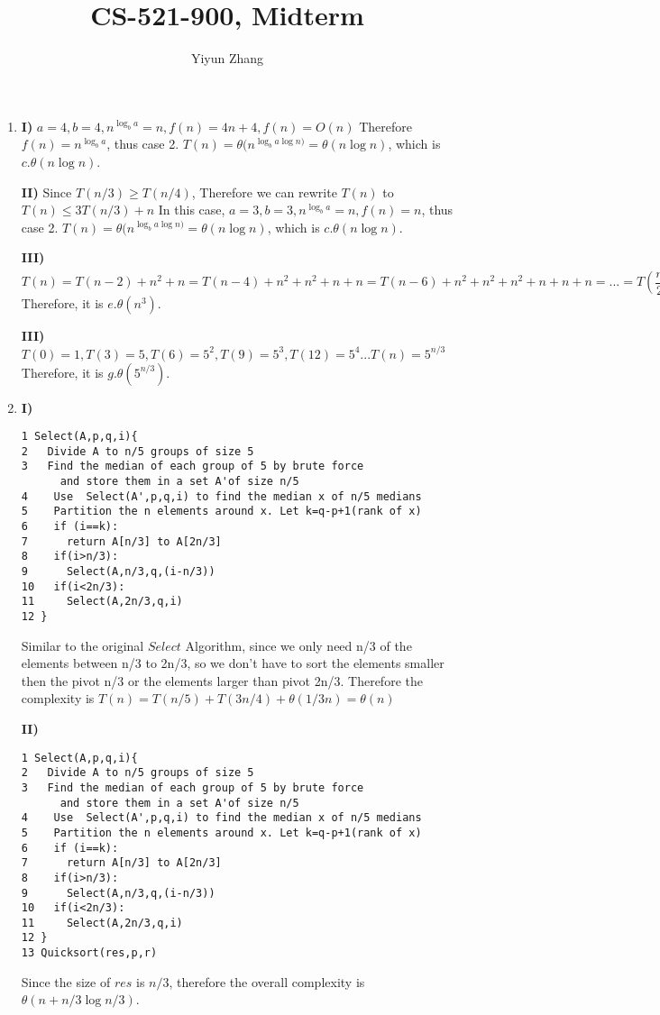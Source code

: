 \documentclass{article}
\title{CS-521-900, Midterm}
\author{Yiyun Zhang}
\begin{document}
\maketitle

\begin{enumerate}
\item 
{\bf I)} $a=4, b=4, n^{\log_b a}=n, f(n)=4n+4, f(n)=O(n)$ Therefore $f(n)=n^{\log_b a}$, thus case 2. $T(n)=\theta (n^{\log_b a\log n)}=\theta(n\log n)$, which is $c.\theta(n\log n)$.

{\bf II)} Since $T(n/3) \geq T(n/4)$, Therefore we can rewrite $T(n)$ to $T(n) \leq 3T(n/3)+n$ In this case, $a=3, b=3, n^{\log_b a}=n, f(n)=n$, thus case 2.  $T(n)=\theta (n^{\log_b a\log n)}=\theta(n\log n)$, which is $c.\theta(n\log n)$.

{\bf III)} $T(n)=T(n-2)+n^2+n=T(n-4)+n^2+n^2+n+n=T(n-6)+n^2+n^2+n^2+n+n+n=...=T(\dfrac{n}{2}(n-2)+\dfrac{n}{2}n^2+\dfrac{n}{2}n)=\dfrac{n^3}{2}+\dfrac{n^2-2n}{2}+\dfrac{n^2}{2}=O(n^3)$Therefore, it is $e.\theta(n^3)$.

{\bf III)} $T(0)=1,T(3)=5,T(6)=5^2,T(9)=5^3,T(12)=5^4...T(n)=5^{n/3}$ Therefore, it is $g.\theta(5^{n/3})$.

\item
{\bf I)}
\begin{verbatim}
1 Select(A,p,q,i){
2   Divide A to n/5 groups of size 5
3   Find the median of each group of 5 by brute force
      and store them in a set A'of size n/5
4    Use  Select(A',p,q,i) to find the median x of n/5 medians
5    Partition the n elements around x. Let k=q-p+1(rank of x)
6    if (i==k):
7      return A[n/3] to A[2n/3] 
8    if(i>n/3):
9      Select(A,n/3,q,(i-n/3))
10   if(i<2n/3):
11     Select(A,2n/3,q,i)
12 }
\end{verbatim}
Similar to the original $Select$ Algorithm, since we only need n/3 of the elements between n/3 to 2n/3, so we don't have to sort the elements smaller then the pivot n/3 or the elements larger than pivot 2n/3. Therefore the complexity is $T(n)=T(n/5)+T(3n/4)+\theta(1/3n)=\theta(n)$

{\bf II)}
\begin{verbatim}
1 Select(A,p,q,i){
2   Divide A to n/5 groups of size 5
3   Find the median of each group of 5 by brute force
      and store them in a set A'of size n/5
4    Use  Select(A',p,q,i) to find the median x of n/5 medians
5    Partition the n elements around x. Let k=q-p+1(rank of x)
6    if (i==k):
7      return A[n/3] to A[2n/3] 
8    if(i>n/3):
9      Select(A,n/3,q,(i-n/3))
10   if(i<2n/3):
11     Select(A,2n/3,q,i)
12 }
13 Quicksort(res,p,r)
\end{verbatim}
Since the size of $res$ is $n/3$, therefore the overall complexity is $\theta(n+n/3\log n/3)$.


\end{enumerate}
\end{document}
